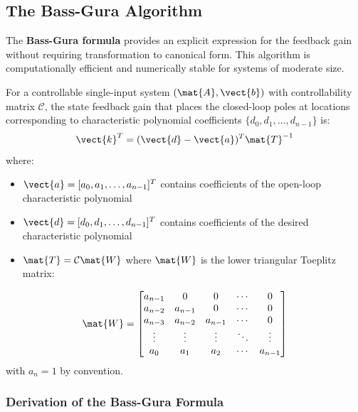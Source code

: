 \subsection{The Bass-Gura Algorithm}
\label{subsec:bass_gura}

The \textbf{Bass-Gura formula} provides an explicit expression for the feedback gain without requiring transformation to canonical form. This algorithm is computationally efficient and numerically stable for systems of moderate size.

\begin{theorem}
For a controllable single-input system $(\mat{A}, \vect{b})$ with controllability matrix $\mathcal{C}$, the state feedback gain that places the closed-loop poles at locations corresponding to characteristic polynomial coefficients $\{d_0, d_1, \ldots, d_{n-1}\}$ is:
\begin{equation}
\vect{k}^T = (\vect{d} - \vect{a})^T \mat{T}^{-1}
\label{eq:bass_gura}
\end{equation}
where:
\begin{itemize}
    \item $\vect{a} = [a_0, a_1, \ldots, a_{n-1}]^T$ contains coefficients of the open-loop characteristic polynomial
    \item $\vect{d} = [d_0, d_1, \ldots, d_{n-1}]^T$ contains coefficients of the desired characteristic polynomial
    \item $\mat{T} = \mathcal{C}\mat{W}$ where $\mat{W}$ is the lower triangular Toeplitz matrix:
\end{itemize}
\begin{equation}
\mat{W} = \begin{bmatrix}
a_{n-1} & 0 & 0 & \cdots & 0 \\
a_{n-2} & a_{n-1} & 0 & \cdots & 0 \\
a_{n-3} & a_{n-2} & a_{n-1} & \cdots & 0 \\
\vdots & \vdots & \vdots & \ddots & \vdots \\
a_0 & a_1 & a_2 & \cdots & a_{n-1}
\end{bmatrix}
\label{eq:toeplitz_matrix}
\end{equation}
with $a_n = 1$ by convention.
\end{theorem}

\subsubsection{Derivation of the Bass-Gura Formula}

